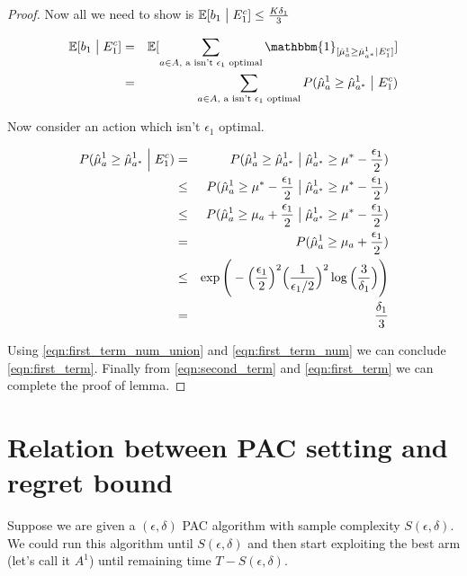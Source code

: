 \documentclass[11pt]{article}
\begin{document}
\begin{proof}
Now all we need to show is $  \mathbb{E}[b_1 \bigm| E_1^c] \leq \frac{K \delta_1}{3}$


\begin{eqnarray}
	\label{eqn:first_term_num}
  \nonumber \mathbb{E}[b_1 \bigm| E_1^c] &=& \mathbb{E}[ \sum_{a \in A, \textnormal{ a isn't $\epsilon_1$ optimal}} \mathbbm{1}_{[\hat{\mu}_a^{1} \geq \hat{\mu}_{a^*}^{1}  |E_1^c ]} ] \\
 &=&  \sum_{a \in A, \textnormal{ a isn't $\epsilon_1$ optimal}} P ( \hat{\mu}_a^{1} \geq \hat{\mu}_{a^*}^{1} \bigm| E_1^c )
\end{eqnarray}

Now consider an action which isn't $ \epsilon_1$ optimal. 

\begin{eqnarray}
	\label{eqn:first_term_num_union}
	\nonumber P(\hat{\mu}_a^{1} \geq \hat{\mu}_{a^*}^{1} \Bigm| E_1^c ) &=& P(\hat{\mu}_a^{1} \geq \hat{\mu}_{a^*}^{1} \bigm|  \hat{\mu}_{a^*}^{1} \geq \mu^{*} - \frac{\epsilon_1}{2}  ) \\
	\nonumber & \leq & P(\hat{\mu}_a^{1} \geq \mu^{*} - \frac{\epsilon_1}{2} \bigm|  \hat{\mu}_{a^*}^{1}  \geq \mu^{*} - \frac{\epsilon_1}{2}  ) \\
	\nonumber & \leq & P(\hat{\mu}_a^{1} \geq \mu_a + \frac{\epsilon_1}{2} \bigm|  \hat{\mu}_{a^*}^{1}  \geq \mu^{*} - \frac{\epsilon_1}{2}  ) \\
	\nonumber &=&  P(\hat{\mu}_a^{1} \geq \mu_a  + \frac{\epsilon_1}{2} )\\
	\nonumber &\leq & \exp \Bigg(- \Big(\frac{\epsilon_1}{2}\Big)^2 \Big(\frac{1}{\epsilon_1/2}\Big)^2 \log \Big(\frac{3}{\delta_1}\Big) \Bigg) \\
	&=& \frac{\delta_1}{3} 
\end{eqnarray} 

Using \eqref{eqn:first_term_num_union} and \eqref{eqn:first_term_num} we can conclude \eqref{eqn:first_term}. Finally from \eqref{eqn:second_term} and \eqref{eqn:first_term} we can complete the proof of lemma. 
\end{proof}
\section{Relation between PAC setting and regret bound}
Suppose we are given a $ (\epsilon, \delta )$ PAC algorithm with sample complexity $ S(\epsilon, \delta ) $. We could run this algorithm until $ S(\epsilon, \delta )$ and then start exploiting the best arm (let's call it $A^1 $) until remaining time $ T -  S(\epsilon, \delta )  $.
 
\end{document}
